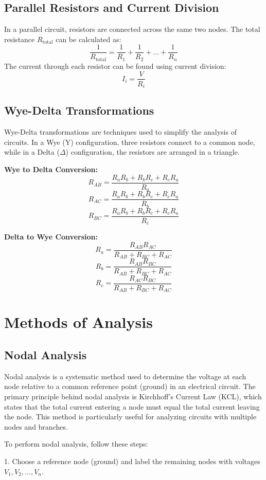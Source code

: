 \documentclass[openany]{book}
\begin{document}
\section{Parallel Resistors and Current Division}
In a parallel circuit, resistors are connected across the same two nodes. The total resistance \(R_{\text{total}}\) can be calculated as:
\[
    \frac{1}{R_{\text{total}}} = \frac{1}{R_1} + \frac{1}{R_2} + \ldots + \frac{1}{R_n}
\]
The current through each resistor can be found using current division:
\[
    I_i = \frac{V}{R_i}
\]

\section{Wye-Delta Transformations}
Wye-Delta transformations are techniques used to simplify the analysis of circuits. In a Wye (Y) configuration, three resistors connect to a common node, while in a Delta ($\Delta$) configuration, the resistors are arranged in a triangle.

\textbf{Wye to Delta Conversion:}
\[
    R_{AB} = \frac{R_a R_b + R_b R_c + R_c R_a}{R_a}
\]
\[
    R_{AC} = \frac{R_a R_b + R_b R_c + R_c R_a}{R_b}
\]
\[
    R_{BC} = \frac{R_a R_b + R_b R_c + R_c R_a}{R_c}
\]

\textbf{Delta to Wye Conversion:}
\[
    R_a = \frac{R_{AB} R_{AC}}{R_{AB} + R_{BC} + R_{AC}}
\]
\[
    R_b = \frac{R_{AB} R_{BC}}{R_{AB} + R_{BC} + R_{AC}}
\]
\[
    R_c = \frac{R_{AC} R_{BC}}{R_{AB} + R_{BC} + R_{AC}}
\]

\chapter{Methods of Analysis}

\section{Nodal Analysis}
Nodal analysis is a systematic method used to determine the voltage at each node relative to a common reference point (ground) in an electrical circuit. The primary principle behind nodal analysis is Kirchhoff's Current Law (KCL), which states that the total current entering a node must equal the total current leaving the node. This method is particularly useful for analyzing circuits with multiple nodes and branches.

To perform nodal analysis, follow these steps:

1. Choose a reference node (ground) and label the remaining nodes with voltages \(V_1, V_2, \ldots, V_n\).
\end{document}
